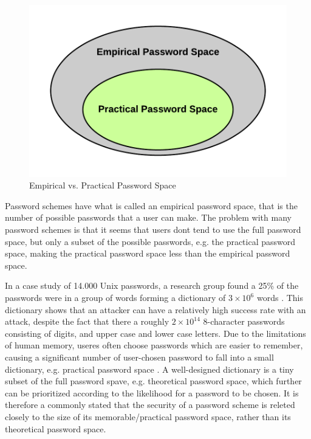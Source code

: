   \begin{figure}
    \vspace{-20pt}
    \begin{center}
      \includegraphics[scale=0.16]{pics/EmpiricalVsPractical.png}
    \end{center}
    \vspace{-20pt}
    \caption{Empirical vs. Practical Password Space}
    \vspace{0pt}
  \end{figure}

  Password schemes have what is called an empirical password space, that is the number of possible passwords that a user can make. The problem with many password schemes is that it seems that users dont tend to use the full password space, but only a subset of the possible passwords, e.g. the practical password space, making the practical password space less than the empirical password space.

  In a case study of 14.000 Unix passwords, a research group found a 25\% of the passwords were in a group of words forming a dictionary of $3\times10^{6}$ words \cite{UnixPasswords}. This dictionary shows that an attacker can have a relatively high success rate with an attack, despite the fact that there a roughly $2\times10^{14}$ 8-character passwords consisting of digits, and upper case and lower case letters. Due to the limitations of human memory, useres often choose passwords which are easier to remember, causing a significant number of user-chosen password to fall into a small dictionary, e.g. practical password space \cite{Tao}. A well-designed dictionary is a tiny subset of the full password spave, e.g. theoretical password space, which further can be prioritized  according to the likelihood for a password to be chosen. It is therefore a commonly stated that the security of a password scheme is releted closely to the size of its memorable/practical password space, rather than its theoretical password space. 

